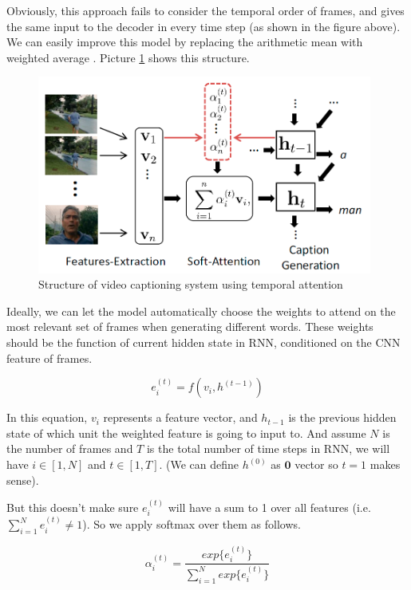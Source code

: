 Obviously, this approach fails to consider the temporal order of frames, and gives the same input to the decoder in every time step (as shown in the figure above). We can easily improve this model by replacing the arithmetic mean with weighted average \cite{yao2015describing}. Picture \ref{fig:sa} shows this structure.

\begin{figure}
\centering
\includegraphics[width=11cm]{resources/sa.png}
\caption{Structure of video captioning system using temporal attention \cite{yao2015describing}}
\label{fig:sa}
\end{figure}

Ideally, we can let the model automatically choose the weights to attend on the most relevant set of frames when generating different words. These weights should be the function of current hidden state in RNN, conditioned on the CNN feature of frames.

\begin{equation}
e_{i}^{(t)} = f(v_i, h^{(t-1)})
\end{equation}

In this equation, $v_i$ represents a feature vector, and $h_{t-1}$ is the previous hidden state of which unit the weighted feature is going to input to. And assume $N$ is the number of frames and $T$ is the total number of time steps in RNN, we will have $i\in [1,N]$ and $t\in [1,T]$. (We can define $h^{(0)}$ as $\mathbf{0}$ vector so $t=1$ makes sense).

But this doesn't make sure $e_{i}^{(t)}$ will have a sum to 1 over all features (i.e. $\sum_{i=1}^Ne_i^{(t)}\neq 1$). So we apply softmax over them as follows.

\begin{equation}
\alpha_{i}^{(t)} = \frac{exp\{e_{i}^{(t)}\}}{\sum_{i=1}^Nexp\{e_{i}^{(t)}\}}
\end{equation}

